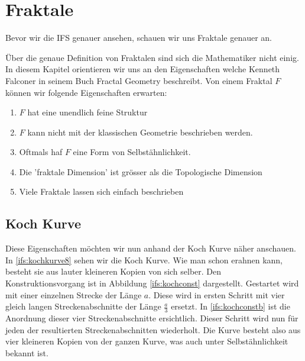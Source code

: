 %
%
%
\section{Fraktale
\label{ifs:section:teil1}}
Bevor wir die IFS genauer ansehen, schauen wir uns Fraktale genauer an.


Über die genaue Definition von Fraktalen sind sich die Mathematiker nicht einig. 
In diesem Kapitel orientieren wir uns an den Eigenschaften welche Kenneth Falconer in seinem Buch Fractal Geometry \cite{ifs:fractal-geometry} beschreibt.
Von einem Fraktal $F$ können wir folgende Eigenschaften erwarten:
\begin{enumerate}
	\item $F$ hat eine unendlich feine Struktur
	\item $F$ kann nicht mit der klassischen Geometrie beschrieben werden.
	\item Oftmals haf $F$ eine Form von Selbstähnlichkeit.
	\item Die 'fraktale Dimension' ist grösser als die Topologische Dimension
	\item Viele Fraktale lassen sich einfach beschrieben
\end{enumerate}
\subsection{Koch Kurve
	\label{ifs:subsection:lilkoch}}
Diese Eigenschaften möchten wir nun anhand der Koch Kurve näher anschauen.
In \ref{ifs:kochkurve8} sehen wir die Koch Kurve. Wie man schon erahnen kann, besteht sie aus lauter kleineren Kopien von sich selber. 
Den Konstruktionsvorgang ist in Abbildung \ref{ifs:kochconst} dargestellt.
Gestartet wird mit einer einzelnen Strecke der Länge $a$.
Diese wird in ersten Schritt mit vier gleich langen Streckenabschnitte der Länge $\frac{a}{3}$ ersetzt.
In \ref{ifs:kochconstb} ist die Anordnung dieser vier Streckenabschnitte ersichtlich. 
Dieser Schritt wird nun für jeden der resultierten Streckenabschnitten wiederholt.
Die Kurve besteht also aus vier kleineren Kopien von der ganzen Kurve, was auch unter Selbstähnlichkeit bekannt ist.


